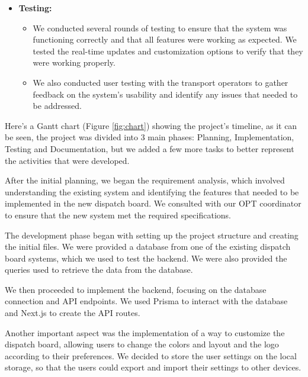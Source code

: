 \documentclass[10pt]{article}
\begin{document}
\begin{itemize}
\begin{itemize}
            \end{itemize}
            \item \textbf{Testing:}
            \begin{itemize}
                \item We conducted several rounds of testing to ensure that the system was functioning correctly and that all features were working as expected. We tested the real-time updates and customization options to verify that they were working properly.
                \item We also conducted user testing with the transport operators to gather feedback on the system's usability and identify any issues that needed to be addressed.
            \end{itemize}
        \end{itemize}

        Here's a Gantt chart (Figure \ref{fig:chart}) showing the project's timeline, as it can be seen, the project was divided into 3 main phases: Planning, Implementation, Testing and Documentation, but we added a few more tasks to better represent the activities that were developed.
        
        After the initial planning, we began the requirement analysis, which involved understanding the existing system and identifying the features that needed to be implemented in the new dispatch board. We consulted with our OPT coordinator to ensure that the new system met the required specifications.

        The development phase began with setting up the project structure and creating the initial files. We were provided a database from one of the existing dispatch board systems, which we used to test the backend. We were also provided the queries used to retrieve the data from the database.

        We then proceeded to implement the backend, focusing on the database connection and API endpoints. We used Prisma to interact with the database and Next.js to create the API routes.

        Another important aspect was the implementation of a way to customize the dispatch board, allowing users to change the colors and layout and the logo according to their preferences. We decided to store the user settings on the local storage, so that the users could export and import their settings to other devices.
\end{document}
